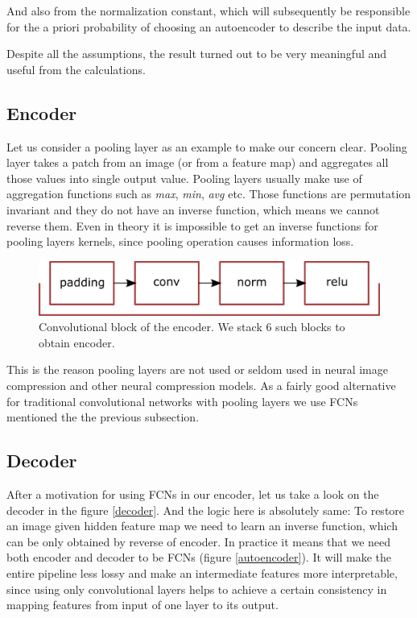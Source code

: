 And also from the normalization constant, which will subsequently be responsible for the a priori probability of choosing an autoencoder to describe the input data.

Despite all the assumptions, the result turned out to be very meaningful and useful from the calculations.

\subsection{Encoder}

Let us consider a pooling layer as an example to make our concern clear. Pooling layer takes a patch from an image (or from a feature map) and aggregates all those values into single output value. Pooling layers usually make use of aggregation functions such as \textit{max}, \textit{min}, \textit{avg} etc. Those functions are permutation invariant and they do not have an inverse function, which means we cannot reverse them. Even in theory it is impossible to get an inverse functions for pooling layers kernels, since pooling operation causes information loss.

\begin{figure}[!ht]
    \centering
    \includegraphics[width=\textwidth]{figure/encoder.png}
    \caption{Convolutional block of the encoder. We stack 6 such blocks to obtain encoder.}
    \label{encoder}
\end{figure}

This is the reason pooling layers are not used or seldom used in neural image compression and other neural compression models. As a fairly good alternative for traditional convolutional networks with pooling layers we use FCNs mentioned the the previous subsection.

\subsection{Decoder}

After a motivation for using FCNs in our encoder, let us take a look on the decoder in the figure \ref{decoder}. And the logic here is absolutely same: To restore an image given hidden feature map we need to learn an inverse function, which can be only obtained by reverse of encoder. In practice it means that we need both encoder and decoder to be FCNs (figure \ref{autoencoder}). It will make the entire pipeline less lossy and make an intermediate features more interpretable, since using only convolutional layers helps to achieve a certain consistency in mapping features from input of one layer to its output.

